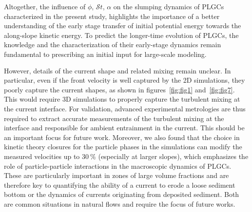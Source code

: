 \documentclass[12pt]{article}
\begin{document}
Altogether, the influence of $\phi$, $\mathcal{S}t$, $\alpha$ on the slumping dynamics of PLGCs characterized in the present study, highlights the importance of a better understanding of the early stage transfer of initial potential energy towards the along-slope kinetic energy. To predict the longer-time evolution of PLGCs, the knowledge and the characterization of their early-stage dynamics remain fundamental to prescribing an initial input for large-scale modeling.

However, details of the current shape and related mixing remain unclear. In particular, even if the front velocity is well captured by the 2D simulations, they poorly capture the current shapes, as shown in figures~\ref{fig:fig1} and~\ref{fig:fig7}. This would require 3D simulations to properly capture the turbulent mixing at the current interface. For validation, advanced experimental metrologies are thus required to extract accurate measurements of the turbulent mixing at the interface and responsible for ambient entrainment in the current. This should be an important focus for future work.
%
Moreover, we also found that the choice in kinetic theory closures for the particle phases in the simulations can modify the measured velocities up to $30~\%$ (especially at larger slopes), which emphasizes the role of particle-particle interactions in the macroscopic dynamics of PLGCs. These are particularly important in zones of large volume fractions and are therefore key to quantifying the ability of a current to erode a loose sediment bottom or the dynamics of currents originating from deposited sediment. Both are common situations in natural flows and require the focus of future works.



\end{document}
